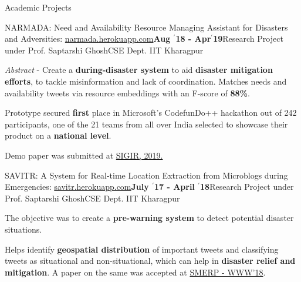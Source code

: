 \documentclass{resume} %
\begin{document}
\begin{rSection}{Academic Projects}
\begin{rSubsection}{ \large NARMADA: Need and Availability Resource Managing Assistant for Disasters and Adversities: \href{http://narmada.herokuapp.com}{narmada.herokuapp.com}}{\textbf{\large Aug $^{\prime}$18 - Apr$^{\prime}$19}}{Research Project under Prof. Saptarshi Ghosh}{CSE Dept. IIT Kharagpur}
\item \textit{Abstract} - Create a \textbf{during-disaster system} to aid \textbf{disaster mitigation efforts}, to tackle misinformation and lack of coordination. Matches needs and availability tweets via resource embeddings with an F-score of \textbf{88\%}.
\item Prototype secured \textbf{first} place in Microsoft's CodefunDo++ hackathon out of 242 participants, one of the 21 teams from all over India selected to showcase their product on a \textbf{national level}.
\item Demo paper was submitted at \href{http://sigir.org/sigir2019/}{SIGIR, 2019.}
\end{rSubsection}


\begin{rSubsection}{ \large SAVITR: A System for Real-time Location Extraction from Microblogs during Emergencies: \href{http://savitr.herokuapp.com}{savitr.herokuapp.com}}{\textbf{\large July $^{\prime}$17 - April $^{\prime}$18}}{Research Project under Prof. Saptarshi Ghosh}{CSE Dept. IIT Kharagpur}
\item The objective was to create a \textbf{pre-warning system} to detect potential disaster situations. 
\item Helps identify \textbf{geospatial distribution} of important tweets and classifying tweets as situational and non-situational, which can help in \textbf{disaster relief and mitigation}. A paper on the same was accepted at \href{https://www.cse.iitk.ac.in/users/kripa/smerp2018/}{SMERP - WWW'18}.
\end{rSubsection}


\end{rSection}
\end{document}
